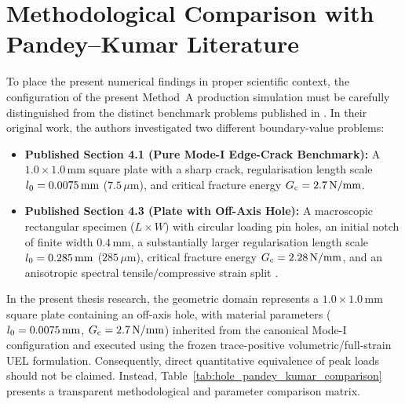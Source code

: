 \section{Methodological Comparison with Pandey--Kumar Literature}
\label{sec:hole_pandey_kumar_comparison}

To place the present numerical findings in proper scientific context, the configuration of the present Method~A production simulation must be carefully distinguished from the distinct benchmark problems published in \citet{pandey2025}. In their original work, the authors investigated two different boundary-value problems:
\begin{itemize}
  \item \textbf{Published Section 4.1 (Pure Mode-I Edge-Crack Benchmark):} A $1.0 \times 1.0\,\mathrm{mm}$ square plate with a sharp crack, regularisation length scale $l_0 = 0.0075\,\mathrm{mm}$ ($7.5\,\mu\mathrm{m}$), and critical fracture energy $G_{\mathrm{c}} = 2.7\,\mathrm{N/mm}$.
  \item \textbf{Published Section 4.3 (Plate with Off-Axis Hole):} A macroscopic rectangular specimen ($L \times W$) with circular loading pin holes, an initial notch of finite width $0.4\,\mathrm{mm}$, a substantially larger regularisation length scale $l_0 = 0.285\,\mathrm{mm}$ ($285\,\mu\mathrm{m}$), critical fracture energy $G_{\mathrm{c}} = 2.28\,\mathrm{N/mm}$, and an anisotropic spectral tensile/compressive strain split \citep{miehe2010a}.
\end{itemize}

In the present thesis research, the geometric domain represents a $1.0 \times 1.0\,\mathrm{mm}$ square plate containing an off-axis hole, with material parameters ($l_0 = 0.0075\,\mathrm{mm}$, $G_{\mathrm{c}} = 2.7\,\mathrm{N/mm}$) inherited from the canonical Mode-I configuration and executed using the frozen trace-positive volumetric/full-strain UEL formulation. Consequently, direct quantitative equivalence of peak loads should not be claimed. Instead, Table~\ref{tab:hole_pandey_kumar_comparison} presents a transparent methodological and parameter comparison matrix.

